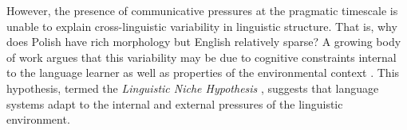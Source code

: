 \documentclass[10pt,letterpaper]{article}
\begin{document}

However, the presence of communicative pressures at the pragmatic timescale is unable to explain cross-linguistic variability in linguistic structure. That is, why does Polish have rich morphology but English relatively sparse? A growing body of work argues that this variability may be due to cognitive constraints internal to the language learner \cite{chater2010language} as well as properties of the environmental context \cite{nettle2012social}. This hypothesis, termed the  {\it Linguistic Niche Hypothesis} \cite{lupyan2010language,wray2007consequences}, suggests that language systems adapt to the internal and external pressures of  the linguistic environment. %




\end{document}
